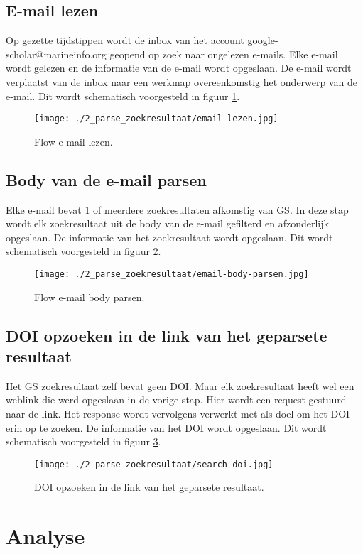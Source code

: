 \subsection{E-mail lezen}
Op gezette tijdstippen wordt de inbox van het account google-scholar@marineinfo.org geopend op zoek naar ongelezen e-mails. Elke e-mail wordt gelezen en de informatie van de e-mail wordt opgeslaan. De e-mail wordt verplaatst van de inbox naar een werkmap overeenkomstig het onderwerp van de e-mail. Dit wordt schematisch voorgesteld in figuur \ref{fig:E-mail lezen}.
\begin{figure}[h!]
    \centering
    \texttt{[image: ./2\_parse\_zoekresultaat/email-lezen.jpg]}
    \caption[E-mail lezen.]{\label{fig:E-mail lezen}Flow e-mail lezen.}
\end{figure}
\subsection{Body van de e-mail parsen}
Elke e-mail bevat 1 of meerdere zoekresultaten afkomstig van GS. In deze stap wordt elk zoekresultaat uit de body van de e-mail gefilterd en afzonderlijk opgeslaan.
De informatie van het zoekresultaat wordt opgeslaan. Dit wordt schematisch voorgesteld in figuur \ref{fig:E-mail body parsen}.
\begin{figure}[h!]
    \centering
    \texttt{[image: ./2\_parse\_zoekresultaat/email-body-parsen.jpg]}
    \caption[E-mail body parsen.]{\label{fig:E-mail body parsen}Flow e-mail body parsen.}
\end{figure}
\subsection{DOI opzoeken in de link van het geparsete resultaat}
Het GS zoekresultaat zelf bevat geen DOI. Maar elk zoekresultaat heeft wel een weblink die werd opgeslaan in de vorige stap. Hier wordt een request gestuurd naar de link. Het response wordt vervolgens verwerkt met als doel om het DOI erin op te zoeken. De informatie van het DOI wordt opgeslaan. Dit wordt schematisch voorgesteld in figuur \ref{fig:E-mail search DOI}.
\begin{figure}[h!]
    \centering
    \texttt{[image: ./2\_parse\_zoekresultaat/search-doi.jpg]}
    \caption[DOI opzoeken in de link van het geparsete resultaat.]{\label{fig:E-mail search DOI}DOI opzoeken in de link van het geparsete resultaat.}
\end{figure}
\section{Analyse}
